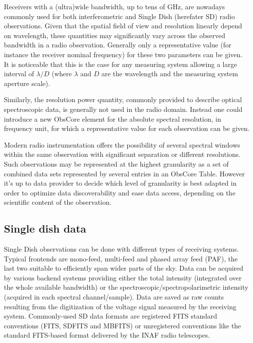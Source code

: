 \documentclass[11pt,a4paper]{ivoa}
\begin{document}
Receivers with a (ultra)wide bandwidth, up to tens of GHz, are
nowadays commonly used for both interferometric and Single Dish (herefater SD) radio observations.
Given that the spatial field of view and resolution linearly depend on wavelength, these quantities may significantly vary across the observed bandwidth in a radio observation.
Generally only a representative value (for instance the
receiver nominal frequency) for these two parameters can be given. It is
noticeable that this is the case for any measuring system allowing a large interval of
$\lambda/D$ (where $\lambda$ and $D$ are the wavelength and the measuring system
aperture scale).
 
Similarly, the resolution power quantity, commonly provided to describe optical spectroscopic data, is generally not used in the radio domain.
Instead one could introduce a new ObsCore element for the absolute spectral resolution, in frequency unit, for which a representative value for each observation can be given.

Modern radio instrumentation offers the possibility of several  spectral windows within the same observation with significant separation or different resolutions.
Such observations may be represented at the highest granularity as  a set of combined data sets represented by several entries in an ObsCore Table. However it's up to data provider to decide which level of granularity is best adapted in order to optimize data discoverability and ease data access, depending on the scientific content of the observation.



\subsection{Single dish data}\label{subsec:sd}

Single Dish observations can be done with different types of receiving systems. Typical frontends are mono-feed, multi-feed and phased array feed (PAF), the last two suitable to efficiently span wider parts of the sky.
Data can be acquired by various backend systems providing either the total intensity (integrated over the whole available bandwidth) or the spectroscopic/spectropolarimetric intensity (acquired in each spectral channel/sample).
Data are saved as raw counts resulting from the digitization of the voltage signal measured by the receiving system.
Commonly-used SD data formats are registered FITS standard conventions (FITS, SDFITS and MBFITS) or unregistered conventions like the standard FITS-based format delivered by the INAF radio telescopes.
\end{document}
